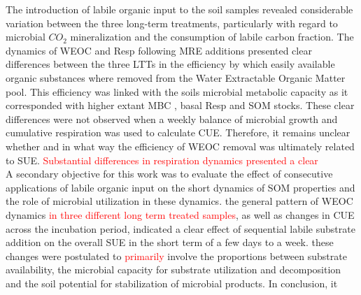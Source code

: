 \documentclass[12pt]{report}
\newcommand{\myRed}[1]{\textcolor{red}{#1}} %
\begin{document}
The introduction of labile organic input to the soil samples revealed considerable variation between the three long-term treatments, particularly with regard to microbial $ CO_2 $ mineralization and the consumption of labile carbon fraction. The dynamics of WEOC and Resp following MRE additions presented clear differences between the three LTTs in the efficiency by which easily available organic substances where removed from the Water Extractable Organic Matter pool. This efficiency was linked with the soils microbial metabolic capacity as it corresponded with higher extant MBC , basal Resp and SOM stocks. These clear differences were not observed when a weekly balance of microbial growth and cumulative respiration was used to calculate CUE. Therefore, it remains unclear whether and in what way the efficiency of WEOC removal was ultimately related to SUE. \myRed{Substantial differences in respiration dynamics presented a clear } \\
A secondary objective for this work was to evaluate the effect of consecutive applications of labile organic input on the short dynamics of SOM properties and the role of microbial utilization in these dynamics. the general pattern of WEOC dynamics \myRed{in three different long term treated samples}, as well as changes in CUE across the incubation period, indicated a clear effect of sequential labile substrate addition on the overall SUE in the short term of a few days to a week. these changes were postulated to \myRed{primarily} involve the proportions between substrate availability, the microbial capacity for substrate utilization and decomposition and the soil potential for stabilization of microbial products. 
In conclusion, it             
    
	



\end{document}
